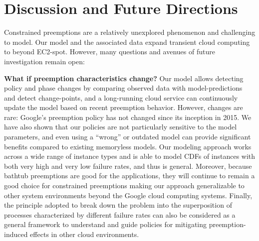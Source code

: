 \vspace*{\subsecspace}
\section{Discussion and Future Directions}
\label{sec:discussion}


Constrained preemptions are a relatively unexplored phenomenon and challenging to model.
Our model and the associated data expand transient cloud computing to beyond EC2-spot.
However, many questions and avenues of future investigation remain open:

\noindent \textbf{What if preemption characteristics change?}
Our model allows detecting policy and phase changes by comparing observed data with model-predictions and detect change-points, and 
a long-running cloud service can continuously update the model based on recent preemption behavior. 
However, changes are rare: Google's preemption policy has not changed since its inception in 2015. 
%
%
%
We have also shown that our policies are not particularly sensitive to the model parameters, and even using a ``wrong'' or outdated model can provide significant benefits compared to existing memoryless models. 
Our modeling approach works across a wide range of instance types and is able to model CDFs of instances with both very high and very low failure rates, and thus is general. Moreover, because bathtub preemptions are good for the applications, they will continue to remain a good choice for constrained preemptions making our approach generalizable to other system environments beyond the Google cloud computing systems. Finally, the principle adopted to break down the problem into the superposition of processes characterized by different failure rates can also be considered as a general framework to understand and guide policies for mitigating preemption-induced effects in other cloud environments.

